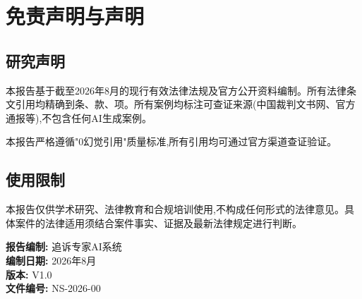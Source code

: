 \documentclass[12pt,a4paper]{article}
\begin{document}
\clearpage

\section{免责声明与声明}

\subsection{研究声明}
本报告基于截至2026年8月的现行有效法律法规及官方公开资料编制。所有法律条文引用均精确到条、款、项。所有案例均标注可查证来源(中国裁判文书网、官方通报等),不包含任何AI生成案例。

本报告严格遵循"0幻觉引用"质量标准,所有引用均可通过官方渠道查证验证。

\subsection{使用限制}
本报告仅供学术研究、法律教育和合规培训使用,不构成任何形式的法律意见。具体案件的法律适用须结合案件事实、证据及最新法律规定进行判断。

\vfill

\begin{center}
\small\color{PrimaryColor}
\textbf{报告编制:} 追诉专家AI系统 \\
\textbf{编制日期:} 2026年8月 \\
\textbf{版本:} V1.0 \\
\textbf{文件编号:} NS-2026-00
\end{center}
\end{document}
